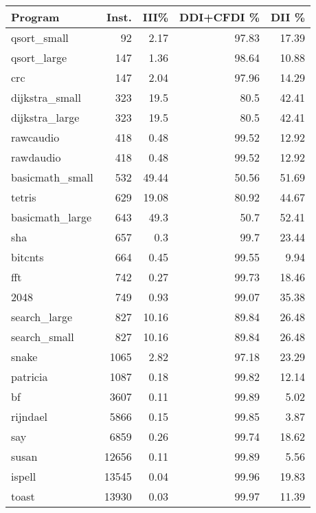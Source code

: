 \begin{tabular}{lrrrr}
\hline
 Program         &   Inst. &   III\% &   DDI+CFDI \% &   DII \% \\
\hline
 qsort\_small     &      92 &   2.17 &        97.83 &   17.39 \\
 qsort\_large     &     147 &   1.36 &        98.64 &   10.88 \\
 crc             &     147 &   2.04 &        97.96 &   14.29 \\
 dijkstra\_small  &     323 &  19.5  &        80.5  &   42.41 \\
 dijkstra\_large  &     323 &  19.5  &        80.5  &   42.41 \\
 rawcaudio       &     418 &   0.48 &        99.52 &   12.92 \\
 rawdaudio       &     418 &   0.48 &        99.52 &   12.92 \\
 basicmath\_small &     532 &  49.44 &        50.56 &   51.69 \\
 tetris          &     629 &  19.08 &        80.92 &   44.67 \\
 basicmath\_large &     643 &  49.3  &        50.7  &   52.41 \\
 sha             &     657 &   0.3  &        99.7  &   23.44 \\
 bitcnts         &     664 &   0.45 &        99.55 &    9.94 \\
 fft             &     742 &   0.27 &        99.73 &   18.46 \\
 2048            &     749 &   0.93 &        99.07 &   35.38 \\
 search\_large    &     827 &  10.16 &        89.84 &   26.48 \\
 search\_small    &     827 &  10.16 &        89.84 &   26.48 \\
 snake           &    1065 &   2.82 &        97.18 &   23.29 \\
 patricia        &    1087 &   0.18 &        99.82 &   12.14 \\
 bf              &    3607 &   0.11 &        99.89 &    5.02 \\
 rijndael        &    5866 &   0.15 &        99.85 &    3.87 \\
 say             &    6859 &   0.26 &        99.74 &   18.62 \\
 susan           &   12656 &   0.11 &        99.89 &    5.56 \\
 ispell          &   13545 &   0.04 &        99.96 &   19.83 \\
 toast           &   13930 &   0.03 &        99.97 &   11.39 \\

\end{tabular}
